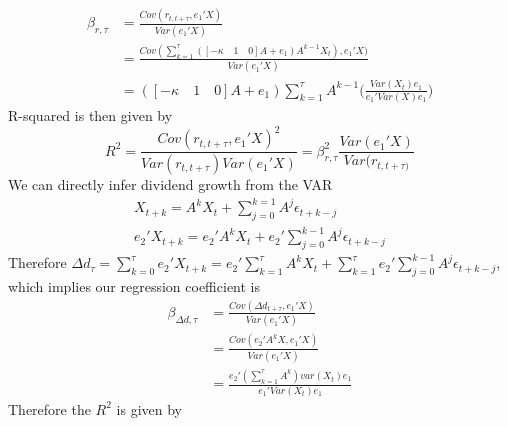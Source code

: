 \documentclass[11pt,letter]{article}
\begin{document}
\begin{equation*}
	\begin{split}
     \beta_{r, \tau} &= \frac{Cov(r_{t, t+\tau}, e_{1}'X)}{Var(e_{1}'X)}\\
     &= \frac{Cov(\sum_{k = 1}^{\tau}([-\kappa\quad 1 \quad 0]A + e_1) A^{k-1} X_t), e_{1}'X)}{Var(e_{1}'X)}\\
     &= ([-\kappa\quad 1 \quad 0]A + e_1)\sum_{k = 1}^{\tau}A^{k-1}\bigg(\frac{Var(X_t)e_{1}}{e_{1}'Var(X)e_1}\bigg)
	\end{split}
\end{equation*}
R-squared is then given by
\begin{equation*}
	R^2 = \frac{Cov(r_{t, t+\tau}, e_{1}'X)^2}{Var(r_{t, t+ \tau})Var(e_1'X)} =\beta^2_{r, \tau}\frac{Var(e_1'X)}{Var(r_{t, t+\tau)}}
\end{equation*}
We can directly infer dividend growth from the VAR
\begin{equation*}
\begin{split}
	X_{t+k} = A^k X_t + \sum_{j=0}^{k=1}A^j \epsilon_{t+k-j}\\
	e_2'X_{t+k} = e_2'A^kX_t + e_2'\sum_{j = 0}^{k-1}A^j \epsilon_{t+k-j}
\end{split}
\end{equation*}
Therefore $\Delta d_\tau = \sum_{k=0}^\tau e_2' X_{t+k} = e_2'\sum_{k=1}^{\tau}A^kX_t + \sum_{k=1}^{\tau}e_2'\sum_{j = 0}^{k-1}A^j \epsilon_{t+k-j}$, which implies our regression coefficient is
\begin{equation*}
	\begin{split}
		\beta_{\Delta d, \tau} &= \frac{Cov(\Delta d_{t + \tau}, e_{1}'X)}{Var(e_{1}'X)}\\
		& = \frac{Cov(e_2' A^k X, e_{1}'X)}{Var(e_{1}'X)}\\
		& = \frac{e_2' (\sum_{k=1}^{\tau}A^k)var(X_t)e_1}{e_1'Var(X_t)e_1}
	\end{split}
\end{equation*}
Therefore the $R^2$ is given by 
\end{document}
